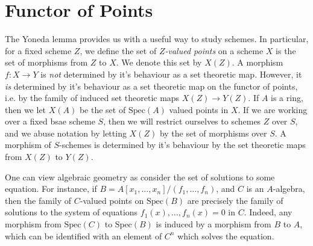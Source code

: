 \section{Functor of Points}

The Yoneda lemma provides us with a useful way to study schemes. In particular, for a fixed scheme $Z$, we define the set of \emph{$Z$-valued points} on a scheme $X$ is the set of morphisms from $Z$ to $X$. We denote this set by $X(Z)$. A morphism $f: X \to Y$ is \emph{not} determined by it's behaviour as a set theoretic map. However, it \emph{is} determined by it's behaviour as a set theoretic map on the functor of points, i.e. by the family of induced set theoretic maps $X(Z) \to Y(Z)$. If $A$ is a ring, then we let $X(A)$ be the set of $\text{Spec}(A)$ valued points in $X$. If we are working over a fixed bsae scheme $S$, then we will restrict ourselves to schemes $Z$ over $S$, and we abuse notation by letting $X(Z)$ by the set of morphisms over $S$. A morphism of $S$-schemes is determined by it's behaviour by the set theoretic maps from $X(Z)$ to $Y(Z)$.

\begin{example}
    One can view algebraic geometry as consider the set of solutions to some equation. For instance, if $B = A[x_1,\dots,x_n]/(f_1,\dots,f_n)$, and $C$ is an $A$-algebra, then the family of $C$-valued points on $\text{Spec}(B)$ are precisely the family of solutions to the system of equations $f_1(x), \dots, f_n(x) = 0$ in $C$. Indeed, any morphism from $\text{Spec}(C)$ to $\text{Spec}(B)$ is induced by a morphism from $B$ to $A$, which can be identified with an element of $C^n$ which solves the equation.
\end{example}

